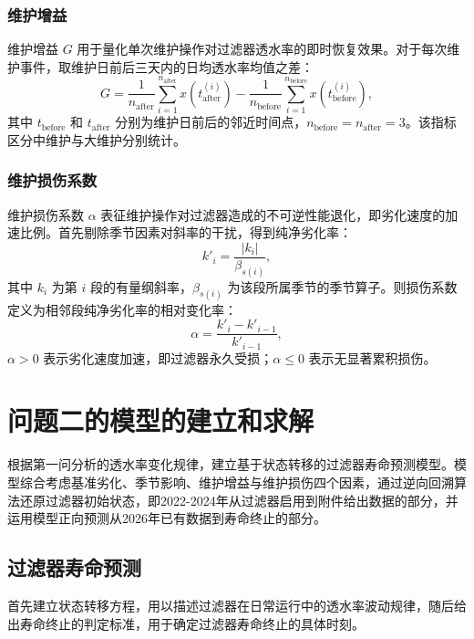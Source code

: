 \documentclass[withoutpreface,bwprint]{cumcmthesis}
\begin{document}
\subsubsection{维护增益}

维护增益 $G$ 用于量化单次维护操作对过滤器透水率的即时恢复效果。对于每次维护事件，取维护日前后三天内的日均透水率均值之差：
\begin{equation}
	G = \frac{1}{n_{\text{after}}} \sum_{i=1}^{n_{\text{after}}} x(t_{\text{after}}^{(i)}) - \frac{1}{n_{\text{before}}} \sum_{i=1}^{n_{\text{before}}} x(t_{\text{before}}^{(i)}),
\end{equation}
其中 $t_{\text{before}}$ 和 $t_{\text{after}}$ 分别为维护日前后的邻近时间点，$n_{\text{before}}=n_{\text{after}}=3$。该指标区分中维护与大维护分别统计。

\subsubsection{维护损伤系数}

维护损伤系数 $\alpha$ 表征维护操作对过滤器造成的不可逆性能退化，即劣化速度的加速比例。首先剔除季节因素对斜率的干扰，得到纯净劣化率：
\[
	k'_i = \frac{|k_i|}{\beta_{s(i)}},
\]
其中 $k_i$ 为第 $i$ 段的有量纲斜率，$\beta_{s(i)}$ 为该段所属季节的季节算子。则损伤系数定义为相邻段纯净劣化率的相对变化率：
\begin{equation}
	\alpha = \frac{k'_{i} - k'_{i-1}}{k'_{i-1}},
	\label{eq:回忆结束}
\end{equation}
$\alpha > 0$ 表示劣化速度加速，即过滤器永久受损；$\alpha \leq 0$ 表示无显著累积损伤。


\section{问题二的模型的建立和求解}

根据第一问分析的透水率变化规律，建立基于状态转移的过滤器寿命预测模型。模型综合考虑基准劣化、季节影响、维护增益与维护损伤四个因素，通过逆向回溯算法还原过滤器初始状态，即2022-2024年从过滤器启用到附件给出数据的部分，并运用模型正向预测从2026年已有数据到寿命终止的部分。

\subsection{过滤器寿命预测}

首先建立状态转移方程，用以描述过滤器在日常运行中的透水率波动规律，随后给出寿命终止的判定标准，用于确定过滤器寿命终止的具体时刻。
\end{document}
